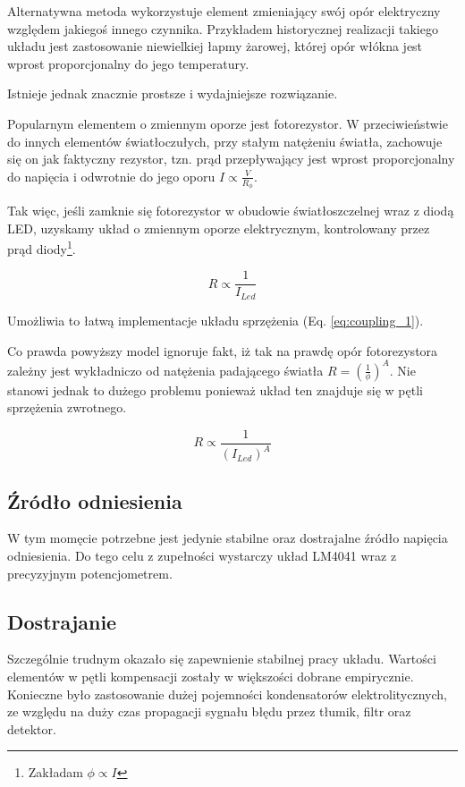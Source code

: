 \documentclass[12pt, a4paper]{article}
\begin{document}
Alternatywna metoda wykorzystuje element zmieniający swój opór elektryczny względem jakiegoś innego czynnika.
Przykładem historycznej realizacji takiego układu jest zastosowanie niewielkiej łapmy żarowej,
której opór włókna jest wprost proporcjonalny do jego temperatury.

Istnieje jednak znacznie prostsze i wydajniejsze rozwiązanie.

Popularnym elementem o zmiennym oporze jest fotorezystor. W przeciwieństwie do innych elementów
światłoczułych, przy stałym natężeniu światła, zachowuje się on jak faktyczny rezystor,
tzn. prąd przepływający jest wprost proporcjonalny do napięcia i odwrotnie do jego oporu
$I \propto \frac{V}{R_{\phi}}$.

Tak więc, jeśli zamknie się fotorezystor w obudowie światłoszczelnej wraz z diodą LED,
uzyskamy układ o zmiennym oporze elektrycznym, kontrolowany przez prąd diody\footnote{Zakładam $\phi \propto I$}.

\begin{equation}
	R \propto \frac{1}{I_{Led}}
\end{equation}

Umożliwia to łatwą implementacje układu sprzężenia (Eq. \ref{eq:coupling_1}). 

Co prawda powyższy model ignoruje fakt,
iż tak na prawdę opór fotorezystora zależny jest wykładniczo od natężenia padającego światła
$R = \left(\frac{1}{\phi}\right)^A$. Nie stanowi jednak to dużego problemu ponieważ układ ten znajduje się w 
pętli sprzężenia zwrotnego.

\begin{equation}
	R \propto \frac{1}{(I_{Led})^A}
\end{equation}

\subsection{Źródło odniesienia}
W tym momęcie potrzebne jest jedynie stabilne oraz dostrajalne źródło napięcia odniesienia.
Do tego celu z zupełności wystarczy układ LM4041 wraz z precyzyjnym potencjometrem.

\subsection{Dostrajanie}
Szczególnie trudnym okazało się zapewnienie stabilnej pracy układu. 
Wartości elementów w pętli kompensacji zostały w większości dobrane empirycznie.
Konieczne było zastosowanie dużej pojemności kondensatorów elektrolitycznych, 
ze względu na duży czas propagacji sygnału błędu przez tłumik, filtr oraz detektor.
\end{document}
